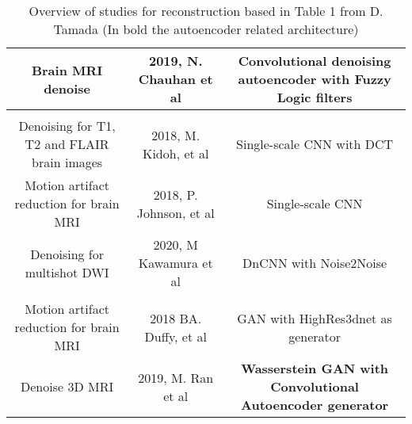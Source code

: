 \begin{table}[!ht]
\begin{tabularx}{\textwidth}{C C C}
        Brain MRI denoise & 2019, N. Chauhan et al \cite{fuzzyautoencoder} & \textbf{Convolutional denoising autoencoder with Fuzzy Logic filters} \\

        \hline
        \\
        \hline

        Denoising for T1, T2 and FLAIR brain images & 2018, M. Kidoh, et al \cite{kidoh2019scnnt1} & Single-scale CNN with DCT \\
        
        Motion artifact reduction for brain MRI & 2018, P. Johnson, et al \cite{scnnmotion} & Single-scale CNN\\
        
        Denoising for multishot DWI & 2020, M Kawamura et al \cite{dncnnnoise2noise} & DnCNN with Noise2Noise \\
        
        \hline
        \\
        \hline
        
        Motion artifact reduction for brain MRI & 2018 BA. Duffy, et al \cite{ganHR3d} & GAN with HighRes3dnet as generator \\
        
        Denoise 3D MRI & 2019, M. Ran et al \cite{wganautoencoder} & \textbf{Wasserstein GAN with Convolutional Autoencoder generator} \\
 
    \bottomrule
    \end{tabularx}
    \caption{Overview of studies for reconstruction based in Table 1 from D. Tamada \cite{tamada2020review} (In bold the autoencoder related architecture)}
    \label{table:paper_overview}
\end{table}

\FloatBarrier

